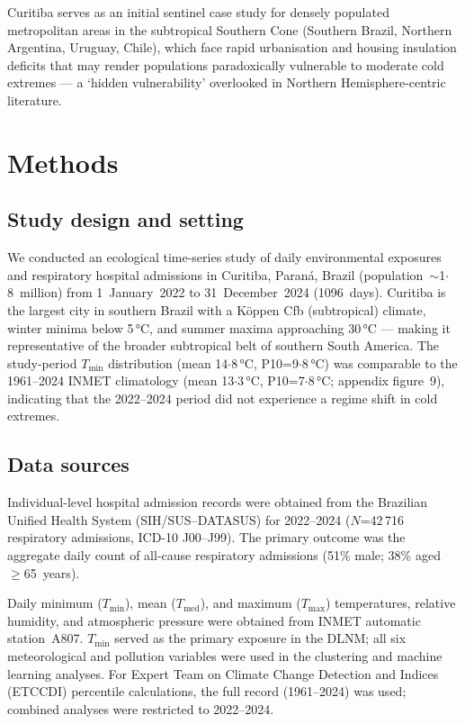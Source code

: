 \documentclass[review,number]{elsarticle}
\begin{document}
Curitiba serves as an initial sentinel case study for densely
populated metropolitan areas
in the subtropical Southern Cone (Southern Brazil, Northern Argentina,
Uruguay, Chile), which face rapid urbanisation and housing insulation
deficits that may render populations paradoxically vulnerable to
moderate cold extremes --- a `hidden vulnerability' overlooked in
Northern Hemisphere-centric
literature.\cite{Gasparrini2015,Cohen2017}

\section{Methods}

\subsection{Study design and setting}

We conducted an ecological time-series study of daily environmental
exposures and respiratory hospital admissions in Curitiba, Paraná,
Brazil (population~$\sim$1${\cdot}$8~million) from
1~January~2022 to 31~December~2024 (1096~days). Curitiba is the
largest city in southern Brazil with a Köppen Cfb (subtropical)
climate, winter minima below 5\,°C, and summer maxima approaching
30\,°C --- making it representative of the broader subtropical belt
of southern South America. The study-period $T_\mathrm{min}$
distribution (mean 14${\cdot}$8\,°C, P10=9${\cdot}$8\,°C) was
comparable to the 1961--2024 INMET climatology (mean 13${\cdot}$3\,°C,
P10=7${\cdot}$8\,°C; appendix figure~9), indicating that the 2022--2024
period did not experience a regime shift in cold extremes.

\subsection{Data sources}

Individual-level hospital admission records were obtained from the
Brazilian Unified Health System (SIH/SUS--DATASUS) for 2022--2024
($N$=42\,716 respiratory admissions, ICD-10 J00--J99). The primary
outcome was the aggregate daily count of all-cause respiratory
admissions (51\% male; 38\% aged $\geq$65~years).

Daily minimum ($T_\mathrm{min}$), mean ($T_\mathrm{med}$), and
maximum ($T_\mathrm{max}$) temperatures, relative humidity, and
atmospheric pressure were obtained from INMET automatic station~A807.
$T_\mathrm{min}$ served as the primary exposure in the DLNM; all six
meteorological and pollution variables were used in the clustering and
machine learning analyses. For Expert Team on Climate Change Detection
and Indices (ETCCDI) percentile calculations, the full record
(1961--2024) was used; combined analyses were restricted to 2022--2024.
\end{document}
